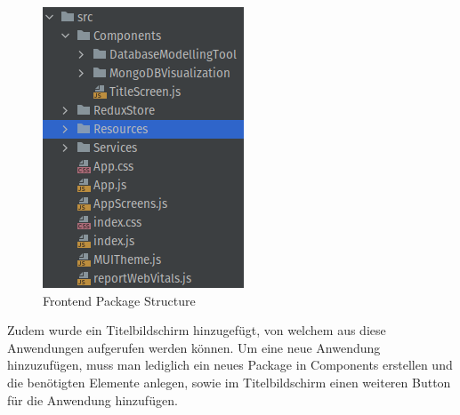 \begin{figure}[H]
    \includegraphics[width=\textwidth / 3]{images/frontend_package_structure}
    \caption{Frontend Package Structure}
    \label{fig:frontend_package_structure}
\end{figure}

Zudem wurde ein Titelbildschirm hinzugefügt, von welchem aus diese Anwendungen aufgerufen werden können.
Um eine neue Anwendung hinzuzufügen, muss man lediglich ein neues Package in Components erstellen und die benötigten Elemente anlegen, sowie im Titelbildschirm einen weiteren Button für die Anwendung hinzufügen.
